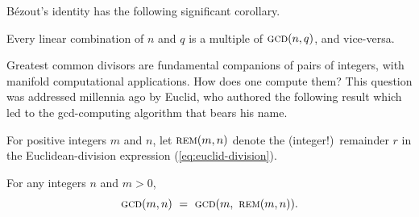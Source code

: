 B\'{e}zout's identity has the following significant corollary.

\begin{corol}
Every linear combination of $n$ and $q$ is a multiple of $\mbox{\sc gcd}(n,q)$, and vice-versa.
\end{corol}


Greatest common divisors are fundamental companions of pairs of integers, with manifold computational applications.  How does one compute them?  This question was addressed millennia ago by Euclid, who authored the following result which led to the {\sc gcd}-computing algorithm that bears his name.

For positive integers $m$ and $n$, let $\mbox{\sc rem}(m,n)$ denote the (integer!)~remainder $r$ in the Euclidean-division expression (\ref{eq:euclid-division}).  


\begin{prop}
\label{thm:gcd-basis}
For any integers $n$ and $m > 0$,
\[ \mbox{\sc gcd}(m,n) \ = \  \mbox{\sc gcd}(m, \ \mbox{\sc rem}(m,n)) . \]
\end{prop}

